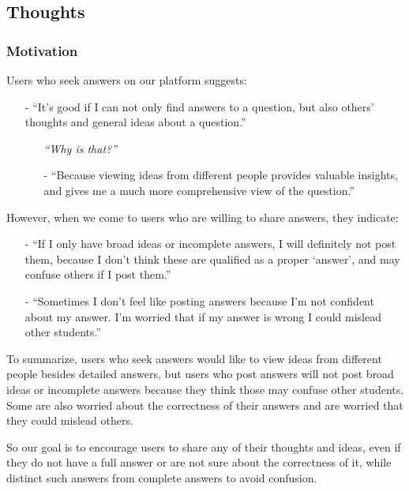 \documentclass[a4paper]{article}
\begin{document}
    \subsection*{Thoughts}

    \subsubsection*{Motivation}
    \noindent Users who seek answers on our platform suggests:
    \begin{itemize}
        \item[-] ``It's good if I can not only find answers to a question, but also others' thoughts and general ideas about a question.''
        \begin{itemize}
            \item[\textbullet] \textit{``Why is that?''}
            \item[-] ``Because viewing ideas from different people provides valuable insights, and gives me a much more comprehensive view of the question.''
        \end{itemize}
    \end{itemize}
    \noindent However, when we come to users who are willing to share answers, they indicate:
    \begin{itemize}
        \item[-] ``If I only have broad ideas or incomplete answers, I will definitely not post them,
        because I don't think these are qualified as a proper `answer', and may confuse others if I post them.''
        \item[-] ``Sometimes I don't feel like posting answers because I'm not confident about my answer.
        I'm worried that if my answer is wrong I could mislead other students.''
    \end{itemize}

    To summarize, users who seek answers would like to view ideas from different people besides detailed answers,
    but users who post answers will not post broad ideas or incomplete answers because they think those may confuse other students.
    Some are also worried about the correctness of their answers and are worried that they could mislead others.

    So our goal is to encourage users to share any of their thoughts and ideas, even if they do not have a full answer
    or are not sure about the correctness of it, while distinct such answers from complete answers to avoid confusion.
\end{document}

